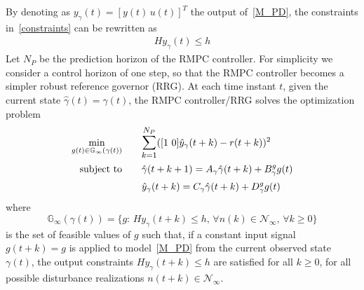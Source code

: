 \documentclass[letterpaper, 10 pt, conference]{ieeeconf}  %
\newcommand{\AB}[1]{\textbf{\color{magenta}{[AB: #1]}}}
\begin{document}
By denoting as $y_{\gamma}(t)=[y(t) \hspace{2pt} u(t)]^T$ the output of~\eqref{M_PD}, the constraints in~\eqref{constraints} can be rewritten as
	\begin{equation*}
	\begin{matrix}
	Hy_{\gamma}(t) \leq h
	\end{matrix}
	\end{equation*}
Let $N_P$ be the prediction horizon of the RMPC controller. For simplicity
we consider a control horizon of one step, so that the RMPC controller
becomes a simpler robust reference governor (RRG).
	At each time instant $t$, given the current state $\hat \gamma(t)=\gamma(t)$, 
the RMPC controller/RRG solves the optimization problem
	\begin{equation}
	\small
	\begin{aligned}
	 \underset{g(t)\in \mathbb{G}_{\infty}(\gamma(t))}{\text{min}}
	&  \hspace{20pt} \mathlarger{\sum\limits_{k=1}^{N_P}}([1\ 0]\hat y_\gamma(t+k)-r(t+k))^2 \\
	\text{subject to}
	& \hspace{20pt} \hat \gamma(t+k+1) = A_\gamma\hat \gamma(t+k) + B_\gamma^g g(t)\\
	& \hspace{20pt} \hat y_{\gamma}(t+k) = C_\gamma\hat \gamma(t+k) + D_\gamma^g g(t)
	\end{aligned}
	\label{RMPC}
	\end{equation}
	\normalsize
	where %
	\begin{equation}
	\mathbb{G}_{\infty}(\gamma(t)) = \{g: \hspace{2pt} Hy_{\gamma}(t+k) \leq h ,\hspace{2pt} \forall n(k) \in \mathcal{N}_{\infty} ,\hspace{2pt} \forall k\geq 0 \} 
	\label{O_infty}
	\end{equation}
is the set %
of feasible values of $g$ such that, if a constant input signal $g(t+k)=g$ is applied to model~\eqref{M_PD} from the current observed state $\gamma(t)$, the output constraints $Hy_{\gamma}(t+k) \leq h$ are satisfied for all $k\geq 0$, for all possible disturbance realizations $n(t+k) \in \mathcal{N}_{\infty}$.
\end{document}
